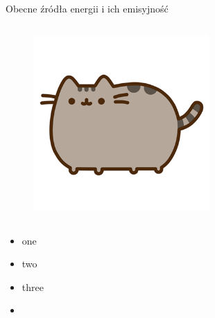 \begin{columnframe}{Obecne źródła energii i ich emisyjność}
    \begin{column}{0.5\textwidth}
        \begin{figure}
            \centering
            \includegraphics[width=0.6\textwidth, frame]{images/pusheen.png}
        \end{figure}
    \end{column}
    \begin{column}{0.5\textwidth}
        \begin{itemize}
            \item one \keV
            \item two \MeV
            \item three \GeV
            \item \aegis
        \end{itemize}
    \end{column}
\end{columnframe}

